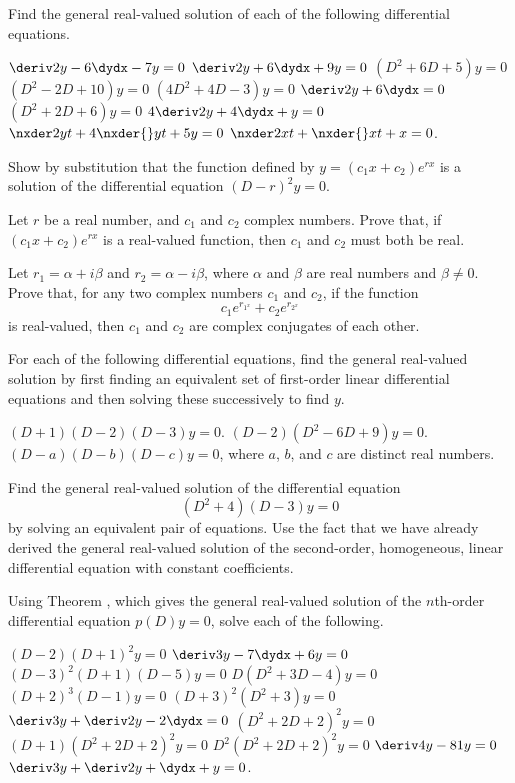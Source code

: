\begin{exercises}

Find the general real-valued solution of each
of the following
differential equations.
\begin{exenum}
\x
$\deriv2y - 6\dydx - 7y = 0$
\x
$\deriv2y + 6\dydx +9y = 0$
\x
$(D^2+6D+5)y = 0$
\x
$(D^2-2D+10)y = 0$
\x
$(4D^2+4D-3)y = 0$
\x
$\deriv2y + 6\dydx = 0$
\x
$(D^2+2D+6)y=0$
\x
$4\deriv2y + 4\dydx + y = 0$
\x
$\nxder2yt + 4 \nxder{}yt + 5y = 0$
\x
$\nxder2xt + \nxder{}xt + x = 0$.
\end{exenum}

Show by substitution that the function
defined by $y=(c_1x + c_2)e^{rx}$
is a solution of the differential equation
$(D-r)^2y=0$.

Let $r$ be a real number, and
$c_1$ and $c_2$ complex numbers.
Prove that, if $(c_1x+c_2)e^{rx}$ is a
real-valued function, then $c_1$ and $c_2$
must both be real.

Let $r_1 =\alpha+i\beta$ and $r_2=\alpha-i\beta$,
where $\alpha$ and $\beta$ are real numbers
and $\beta \ne 0$.
Prove that, for any two complex numbers $c_1$
and $c_2$, if the function
\[
c_1e^{r_{1^x}} + c_2e^{r_{2^x}}
\]
is real-valued, then $c_1$ and $c_2$ are complex
conjugates of each other.

For each of the following differential equations,
find the general real-valued solution by first
finding an equivalent set of first-order linear differential
equations and then solving these successively
to find $y$.
\begin{exenum}
\x
$(D+1)(D-2)(D-3)y=0$.
\x
$(D-2)(D^2-6D+9)y=0$.
\x
$(D-a)(D-b)(D-c)y=0$,
where $a$, $b$, and $c$ are distinct real numbers.
\end{exenum}

Find the general real-valued solution of the
differential equation
\[
(D^2+4)(D-3)y=0
\]
by solving an equivalent pair of equations.
Use the fact that we have already derived
the general real-valued solution of the
second-order, homogeneous, linear
differential equation with constant coefficients.

Using Theorem , which gives
the general real-valued solution of the $n$th-order
differential equation $p(D)y=0$,
solve each of the following.
\begin{exenum}
\x
$(D-2)(D+1)^2y=0$
\x
$\deriv3y - 7\dydx + 6y = 0$
\x
$(D-3)^2(D+1)(D-5)y=0$
\x
$D(D^2+3D-4)y=0$
\x
$(D+2)^3(D-1)y=0$
\x
$(D+3)^2(D^2+3)y=0$
\x
$\deriv3y + \deriv2y - 2\dydx = 0$
\x
$(D^2+2D+2)^2y=0$
\x
$(D+1)(D^2+2D+2)^2y=0$
\x
$D^2(D^2+2D+2)^2y=0$
\x
$\deriv4y - 81y = 0$
\x
$\deriv3y+\deriv2y+\dydx+y=0$.
\end{exenum}

\end{exercises}
